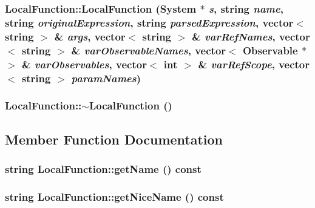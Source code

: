 \subsubsection{\setlength{\rightskip}{0pt plus 5cm}LocalFunction::LocalFunction ({\bf System} $\ast$ {\em s}, string {\em name}, string {\em originalExpression}, string {\em parsedExpression}, vector$<$ string $>$ \& {\em args}, vector$<$ string $>$ \& {\em varRefNames}, vector$<$ string $>$ \& {\em varObservableNames}, vector$<$ {\bf Observable} $\ast$ $>$ \& {\em varObservables}, vector$<$ int $>$ \& {\em varRefScope}, vector$<$ string $>$ {\em paramNames})}\label{classNFcore_1_1LocalFunction_7c669519fe3ec402f65c8117372da775}


\subsubsection{\setlength{\rightskip}{0pt plus 5cm}LocalFunction::$\sim$LocalFunction ()}\label{classNFcore_1_1LocalFunction_a78ebddc2c447014891ac0b591e39445}




\subsection{Member Function Documentation}
\subsubsection{\setlength{\rightskip}{0pt plus 5cm}string LocalFunction::getName () const}\label{classNFcore_1_1LocalFunction_53e067c7b8d204ab4c8cf552b000999d}


\subsubsection{\setlength{\rightskip}{0pt plus 5cm}string LocalFunction::getNiceName () const}\label{classNFcore_1_1LocalFunction_ccb96efc45b9c37eb77b86389877a9ed}


